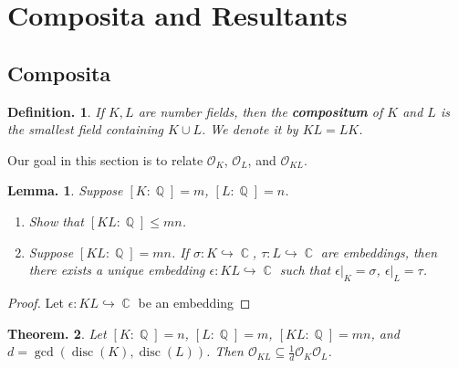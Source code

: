 \documentclass[11pt, a4paper]{memoir}
\DeclareMathOperator{\Q}{{\mathbb{Q}}}
\DeclareMathOperator{\C}{{\mathbb{C}}}
\newcommand{\hto}[0]{\ensuremath{\hookrightarrow}}
\theoremstyle{change}
\newtheorem{theorem}{Theorem.}[section]
\newtheorem{lemma}[theorem]{Lemma.}
\theoremstyle{plain}
\theoremstyle{nonumberplain}
\newtheorem{definition}{Definition.}
\newtheorem{remark}{Remark.}
\newtheorem{proof}{Proof}
\DeclareMathOperator{\disc}{disc}
\newcommand{\quot}[2]{\mathchoice{\left.\raisebox{0.13em}{$#1$}\middle/\raisebox{-0.13em}{$#2$}\right.}
                                 {\left.\raisebox{0.07em}{$#1$}\middle/\raisebox{-0.07em}{$#2$}\right.}
                                 {\left.\raisebox{0.03em}{$#1$}\middle/\raisebox{-0.03em}{$#2$}\right.}
                                 {\left.\raisebox{0em}{$#1$}\middle/\raisebox{0em}{$#2$}\right.}}
\newcommand{\mbf}[1]{{\boldmath\bfseries #1}}
\numberwithin{equation}{section}
\begin{document}
\section{Composita and Resultants}
\subsection{Composita}
\begin{definition}
    If $K,L$ are number fields, then the \mbf{compositum} of $K$ and $L$ is the smallest field containing $K\cup L$.
    We denote it by $KL=LK$.
\end{definition}
Our goal in this section is to relate $\mathcal{O}_K$, $\mathcal{O}_L$, and $\mathcal{O}_{KL}$.
\begin{lemma}\label{lem:ext-comp}
    Suppose $[K:\Q]=m$, $[L:\Q]=n$.
    \begin{enumerate}[nl,r]
        \item Show that $[KL:\Q]\leq mn$.
        \item Suppose $[KL:\Q]=mn$.
            If $\sigma:K\hto\C$, $\tau:L\hto\C$ are embeddings, then there exists a unique embedding $\epsilon:KL\hto\C$ such that $\epsilon|_K=\sigma$, $\epsilon|_L=\tau$.
    \end{enumerate}
\end{lemma}
\begin{proof}
    Let $\epsilon:KL\hto\C$ be an embedding
\end{proof}
\begin{theorem}\label{thm:comp}
    Let $[K:\Q]=n$, $[L:\Q]=m$, $[KL:\Q]=mn$, and $d=\gcd(\disc(K),\disc(L))$.
    Then $\mathcal{O}_{KL}\subseteq\frac{1}{d}\mathcal{O}_K\mathcal{O}_L$.
\end{theorem}
\end{document}
